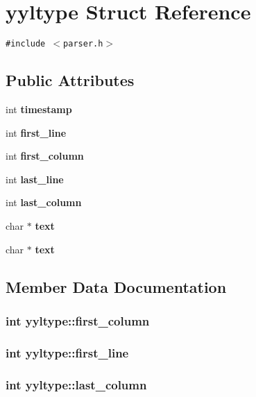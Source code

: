 \section{yyltype  Struct Reference}
\label{structyyltype}
{\tt \#include $<$parser.h$>$}

\subsection*{Public Attributes}
\begin{CompactItemize}
\item 
int {\bf timestamp}
\item 
int {\bf first\_\-line}
\item 
int {\bf first\_\-column}
\item 
int {\bf last\_\-line}
\item 
int {\bf last\_\-column}
\item 
char $\ast$ {\bf text}
\item 
char $\ast$ {\bf text}
\end{CompactItemize}


\subsection{Member Data Documentation}
\subsubsection{\setlength{\rightskip}{0pt plus 5cm}int yyltype::first\_\-column}\label{structyyltype_m2}


\subsubsection{\setlength{\rightskip}{0pt plus 5cm}int yyltype::first\_\-line}\label{structyyltype_m1}


\subsubsection{\setlength{\rightskip}{0pt plus 5cm}int yyltype::last\_\-column}\label{structyyltype_m4}


